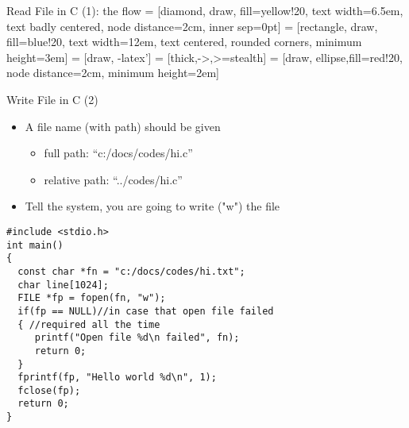 \begin{frame}[fragile]{Read File in C (1): the flow}
 = [diamond, draw, fill=yellow!20, 
    text width=6.5em, text badly centered, node distance=2cm, inner sep=0pt]
 = [rectangle, draw, fill=blue!20, 
    text width=12em, text centered, rounded corners, minimum height=3em]
 = [draw, -latex']
 = [thick,->,>=stealth]
 = [draw, ellipse,fill=red!20, node distance=2cm,
    minimum height=2em]
\begin{center}


\end{center}
\end{frame}

\begin{frame}[fragile]{Write File in C (2)}
\begin{itemize}
	\item {A file name (with path) should be given}
	\begin{itemize}
		\item {full path: ``c:/docs/codes/hi.c''}
		\item {relative path: ``../codes/hi.c''}
	\end{itemize}
	\item {Tell the system, you are going to write ("w") the file}
\end{itemize}
\begin{lstlisting}[xleftmargin=0.06\linewidth, linewidth=0.85\linewidth]
#include <stdio.h>
int main()
{
  const char *fn = "c:/docs/codes/hi.txt";
  char line[1024];
  FILE *fp = fopen(fn, "w");
  if(fp == NULL)//in case that open file failed
  { //required all the time
     printf("Open file %d\n failed", fn);
     return 0;
  }
  fprintf(fp, "Hello world %d\n", 1);
  fclose(fp); 
  return 0;
}
\end{lstlisting}
\end{frame}

